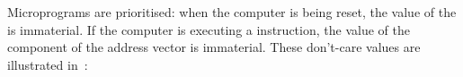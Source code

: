 Microprograms are prioritised: when the computer is being reset, the value of
the \IR{} is immaterial. If the computer is executing a  instruction,
the value of the  component of the address vector is immaterial. These
don't-care values are illustrated in~:

